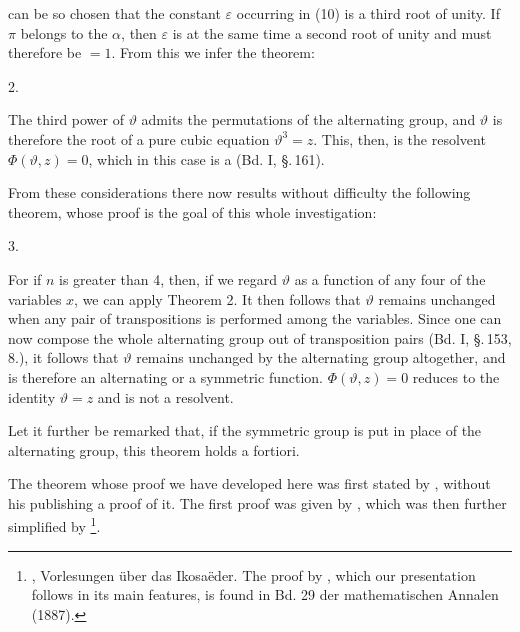 can be so chosen that the constant $\varepsilon$ occurring in (10) is 
a third root of unity. If $\pi$ belongs to the $\alpha$, then $\varepsilon$
is at the same time a second root of unity and must therefore be $=1$.
From this we infer the theorem:

2. 

The third power of $\vartheta$ admits the permutations of the alternating
group, and $\vartheta$ is therefore the root of a pure cubic equation
$\vartheta^3 = z$. This, then, is the resolvent $\Phi(\vartheta,z) = 0$,
which in this case is a  (Bd. I, \S.\,161).

From these considerations there now results without difficulty the following theorem,
whose proof is the goal of this whole
investigation:

3. 

For if $n$ is greater than 4, then, if we regard $\vartheta$ as a function
of any four of the variables $x$, we can apply Theorem 2.
It then follows that $\vartheta$ remains unchanged when any
pair of transpositions is performed among the variables. Since one
can now compose the whole alternating group out of transposition pairs
(Bd. I, \S.\,153, 8.), it follows that $\vartheta$ remains unchanged by
the alternating group altogether, and is therefore an alternating or
a symmetric function. $\Phi(\vartheta,z) = 0$ reduces to
the identity $\vartheta = z$ and is not a resolvent.

Let it further be remarked that, if the symmetric group is put in place
of the alternating group, this theorem holds a fortiori.

The theorem whose proof we have developed here was first
stated by , without his publishing a proof
of it. The first proof was given by , which
was then further simplified by \footnote{, Vorlesungen über das Ikosaëder. The
proof by , which our presentation follows in its main
features, is found in Bd. 29 der mathematischen Annalen (1887).}.
